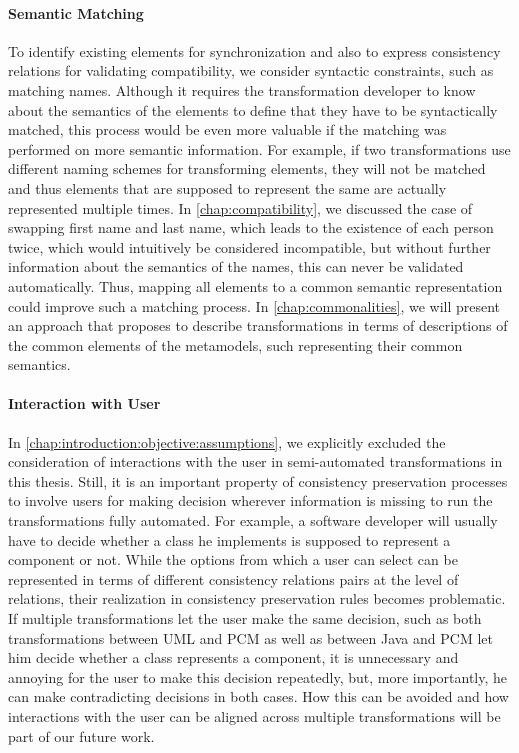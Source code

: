 \paragraph{Semantic Matching}
\label{chap:futurework:correctness:synchronization:semantic_matching}
To identify existing elements for synchronization and also to express consistency relations for validating compatibility, we consider syntactic constraints, such as matching names.
Although it requires the transformation developer to know about the semantics of the elements to define that they have to be syntactically matched, this process would be even more valuable if the matching was performed on more semantic information.
For example, if two transformations use different naming schemes for transforming elements, they will not be matched and thus elements that are supposed to represent the same are actually represented multiple times.
In \autoref{chap:compatibility}, we discussed the case of swapping first name and last name, which leads to the existence of each person twice, which would intuitively be considered incompatible, but without further information about the semantics of the names, this can never be validated automatically.
Thus, mapping all elements to a common semantic representation could improve such a matching process.
In \autoref{chap:commonalities}, we will present an approach that proposes to describe transformations in terms of descriptions of the common elements of the metamodels, such representing their common semantics.

\paragraph{Interaction with User}
\label{chap:futurework:correctness:synchronization:user_interaction}
In \autoref{chap:introduction:objective:assumptions}, we explicitly excluded the consideration of interactions with the user in semi-automated transformations in this thesis.
Still, it is an important property of consistency preservation processes to involve users for making decision wherever information is missing to run the transformations fully automated.
For example, a software developer will usually have to decide whether a class he implements is supposed to represent a component or not.
While the options from which a user can select can be represented in terms of different consistency relations pairs at the level of relations, their realization in consistency preservation rules becomes problematic.
If multiple transformations let the user make the same decision, such as both transformations between \gls{UML} and \gls{PCM} as well as between Java and \gls{PCM} let him decide whether a class represents a component, it is unnecessary and annoying for the user to make this decision repeatedly, but, more importantly, he can make contradicting decisions in both cases.
How this can be avoided and how interactions with the user can be aligned across multiple transformations will be part of our future work.

